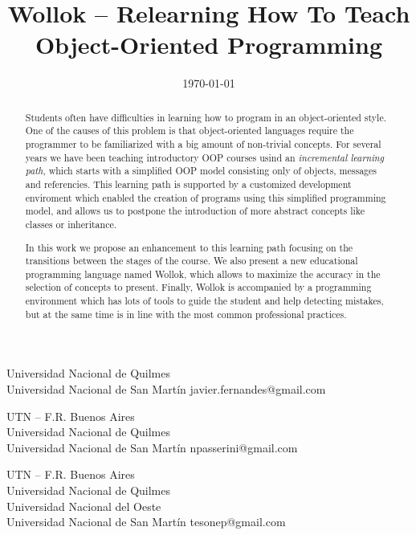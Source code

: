 \documentclass[preprint,10pt,nocopyrightspace]{sigplanconf}
\begin{document}
\title{Wollok -- Relearning How To Teach Object-Oriented Programming}
  {Universidad Nacional de Quilmes \\ Universidad Nacional de San Martín}
  {javier.fernandes@gmail.com}
  
  {UTN -- F.R. Buenos Aires \\ Universidad Nacional de Quilmes \\ Universidad Nacional de San Martín}
  {npasserini@gmail.com}
  
  {UTN -- F.R. Buenos Aires \\ Universidad Nacional de Quilmes \\ Universidad Nacional del Oeste \\ Universidad Nacional de San Martín}
  {tesonep@gmail.com}

\date{\today}
\maketitle

\begin{abstract}
Students often have difficulties in learning how to program in an object-oriented style.
One of the causes of this problem is that object-oriented languages require the programmer to be familiarized with a big amount of non-trivial concepts.
For several years we have been teaching introductory OOP courses usind an \emph{incremental learning path}, 
which starts with a simplified OOP model consisting only of objects, messages and referencies.
This learning path is supported by a customized development enviroment which enabled the creation of programs using this {simplified programming model},
and allows us to postpone the introduction of more abstract concepts like classes or inheritance.

In this work we propose an enhancement to this learning path focusing on the transitions between the stages of the course.
We also present a new educational programming language named Wollok, which allows to maximize the accuracy in the selection of concepts to present.
Finally, Wollok is accompanied by a programming environment which has lots of tools to guide the student and help detecting mistakes, 
but at the same time is in line with the most common professional practices.
\end{abstract}





\end{document}
